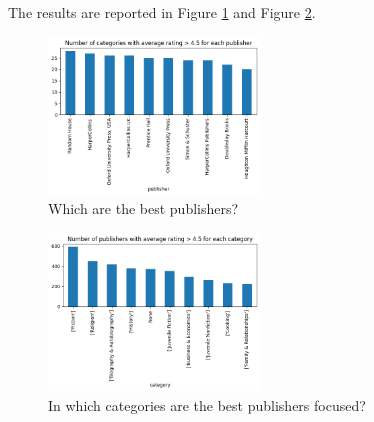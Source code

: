 The results are reported in Figure \ref{fig:h6_which_best} and Figure \ref{fig:h6_where_best}.

\begin{figure}[H]
    \centering
    \includegraphics[width=0.5\textwidth]{./figures/h6_which_best.png}
    \caption{Which are the best publishers?}
    \label{fig:h6_which_best}
\end{figure}

\begin{figure}[H]
    \centering
    \includegraphics[width=0.5\textwidth]{./figures/h6_where_best.png}
    \caption{In which categories are the best publishers focused?}
    \label{fig:h6_where_best}
\end{figure}